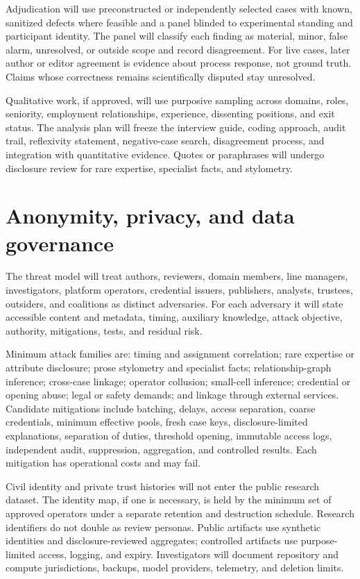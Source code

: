 \documentclass[11pt]{article}
\begin{document}
Adjudication will use preconstructed or independently selected cases with known,
sanitized defects where feasible and a panel blinded to experimental standing and
participant identity. The panel will classify each finding as material, minor,
false alarm, unresolved, or outside scope and record disagreement. For live cases,
later author or editor agreement is evidence about process response, not ground
truth. Claims whose correctness remains scientifically disputed stay unresolved.

Qualitative work, if approved, will use purposive sampling across domains, roles,
seniority, employment relationships, experience, dissenting positions, and exit
status. The analysis plan will freeze the interview guide, coding approach, audit
trail, reflexivity statement, negative-case search, disagreement process, and
integration with quantitative evidence. Quotes or paraphrases will undergo
disclosure review for rare expertise, specialist facts, and stylometry.

\section{Anonymity, privacy, and data governance}

The threat model will treat authors, reviewers, domain members, line managers,
investigators, platform operators, credential issuers, publishers, analysts,
trustees, outsiders, and coalitions as distinct adversaries. For each adversary it
will state accessible content and metadata, timing, auxiliary knowledge, attack
objective, authority, mitigations, tests, and residual risk.

Minimum attack families are: timing and assignment correlation; rare expertise or
attribute disclosure; prose stylometry and specialist facts; relationship-graph
inference; cross-case linkage; operator collusion; small-cell inference; credential
or opening abuse; legal or safety demands; and linkage through external services.
Candidate mitigations include batching, delays, access separation, coarse
credentials, minimum effective pools, fresh case keys, disclosure-limited
explanations, separation of duties, threshold opening, immutable access logs,
independent audit, suppression, aggregation, and controlled results. Each mitigation
has operational costs and may fail.

Civil identity and private trust histories will not enter the public research
dataset. The identity map, if one is necessary, is held by the minimum set of
approved operators under a separate retention and destruction schedule. Research
identifiers do not double as review personas. Public artifacts use synthetic
identities and disclosure-reviewed aggregates; controlled artifacts use purpose-
limited access, logging, and expiry. Investigators will document repository and
compute jurisdictions, backups, model providers, telemetry, and deletion limits.
\end{document}
